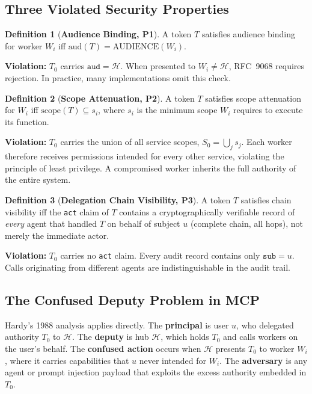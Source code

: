 \documentclass[journal]{IEEEtran}
\theoremstyle{definition}
\newtheorem{definition}{Definition}             %
\begin{document}
\subsection{Three Violated Security Properties}

\begin{definition}[\textbf{Audience Binding, P1}]
A token $T$ satisfies audience binding for worker $W_i$ iff
$\mathrm{aud}(T) = \mathrm{AUDIENCE}(W_i)$.
\end{definition}

\textbf{Violation:} $T_0$ carries $\texttt{aud} = \mathcal{H}$. When presented
to $W_i \neq \mathcal{H}$, RFC~9068 requires rejection. In practice, many
implementations omit this check.

\begin{definition}[\textbf{Scope Attenuation, P2}]
A token $T$ satisfies scope attenuation for $W_i$ iff
$\mathrm{scope}(T) \subseteq s_i$, where $s_i$ is the minimum scope $W_i$
requires to execute its function.
\end{definition}

\textbf{Violation:} $T_0$ carries the union of all service scopes,
$S_0 = \bigcup_j s_j$. Each worker therefore receives permissions intended
for every other service, violating the principle of least privilege. A
compromised worker inherits the full authority of the entire system.

\begin{definition}[\textbf{Delegation Chain Visibility, P3}]
A token $T$ satisfies chain visibility iff the \texttt{act} claim of $T$
contains a cryptographically verifiable record of \emph{every} agent that
handled $T$ on behalf of subject $u$ (complete chain, all hops), not merely
the immediate actor.
\end{definition}

\textbf{Violation:} $T_0$ carries no \texttt{act} claim. Every audit record
contains only $\texttt{sub} = u$. Calls originating from different agents are
indistinguishable in the audit trail.

\subsection{The Confused Deputy Problem in MCP}

Hardy's 1988 analysis \cite{hardy1988} applies directly. The \textbf{principal}
is user $u$, who delegated authority $T_0$ to $\mathcal{H}$. The \textbf{deputy}
is hub $\mathcal{H}$, which holds $T_0$ and calls workers on the user's behalf.
The \textbf{confused action} occurs when $\mathcal{H}$ presents $T_0$ to
worker $W_i$, where it carries capabilities that $u$ never intended for $W_i$.
The \textbf{adversary} is any agent or prompt injection payload that exploits
the excess authority embedded in $T_0$.
\end{document}
